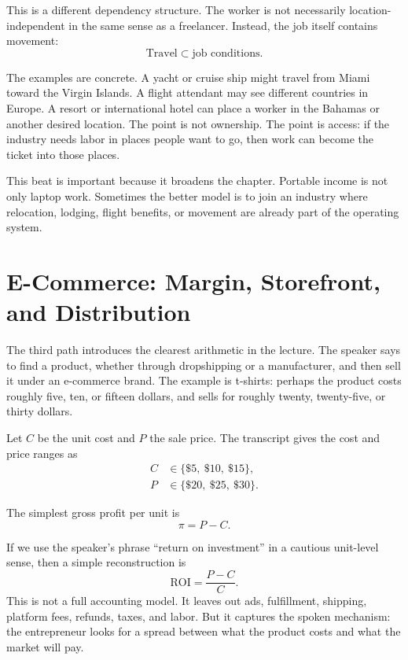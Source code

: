 This is a different dependency structure. The worker is not necessarily location-independent in the same sense as a freelancer. Instead, the job itself contains movement:
\begin{equation}
\text{Travel}
\subset
\text{job conditions}.
\end{equation}

The examples are concrete. A yacht or cruise ship might travel from Miami toward the Virgin Islands. A flight attendant may see different countries in Europe. A resort or international hotel can place a worker in the Bahamas or another desired location. The point is not ownership. The point is access: if the industry needs labor in places people want to go, then work can become the ticket into those places.

This beat is important because it broadens the chapter. Portable income is not only laptop work. Sometimes the better model is to join an industry where relocation, lodging, flight benefits, or movement are already part of the operating system.

\section{E-Commerce: Margin, Storefront, and Distribution}

The third path introduces the clearest arithmetic in the lecture. The speaker says to find a product, whether through dropshipping or a manufacturer, and then sell it under an e-commerce brand. The example is t-shirts: perhaps the product costs roughly five, ten, or fifteen dollars, and sells for roughly twenty, twenty-five, or thirty dollars.

Let \(C\) be the unit cost and \(P\) the sale price. The transcript gives the cost and price ranges as
\begin{align}
C &\in \{\$5,\ \$10,\ \$15\},\\
P &\in \{\$20,\ \$25,\ \$30\}.
\end{align}

The simplest gross profit per unit is
\begin{equation}
\pi = P-C.
\end{equation}

If we use the speaker's phrase ``return on investment'' in a cautious unit-level sense, then a simple reconstruction is
\begin{equation}
\mathrm{ROI} = \frac{P-C}{C}.
\end{equation}
This is not a full accounting model. It leaves out ads, fulfillment, shipping, platform fees, refunds, taxes, and labor. But it captures the spoken mechanism: the entrepreneur looks for a spread between what the product costs and what the market will pay.

